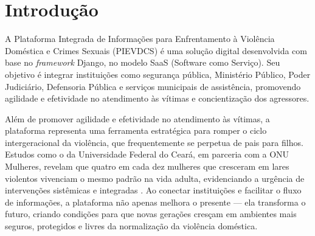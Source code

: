 
%
%
%
\section{Introdução}

\noindent \begin{minipage}[c]{0.6\textwidth}
  \vspace {1cm}
  A Plataforma Integrada de Informações para Enfrentamento à Violência Doméstica e Crimes Sexuais (PIEVDCS) é uma solução digital desenvolvida com base no \textit{framework} Django, no modelo SaaS (Software como Serviço). Seu objetivo é integrar instituições como segurança pública, Ministério Público, Poder Judiciário, Defensoria Pública e serviços municipais de assistência, promovendo agilidade e efetividade no atendimento às vítimas e concientização dos agressores.

  Além de promover agilidade e efetividade no atendimento às vítimas, a plataforma representa uma ferramenta estratégica para romper o ciclo intergeracional da violência, que frequentemente se perpetua de pais para filhos. Estudos como o da Universidade Federal do Ceará, em parceria com a ONU Mulheres, revelam que quatro em cada dez mulheres que cresceram em lares violentos vivenciam o mesmo padrão na vida adulta, evidenciando a urgência de intervenções sistêmicas e integradas \cite{carvalho2017transmissao}. Ao conectar instituições e facilitar o fluxo de informações, a plataforma não apenas melhora o presente — ela transforma o futuro, criando condições para que novas gerações cresçam em ambientes mais seguros, protegidos e livres da normalização da violência doméstica.

\end{minipage}
